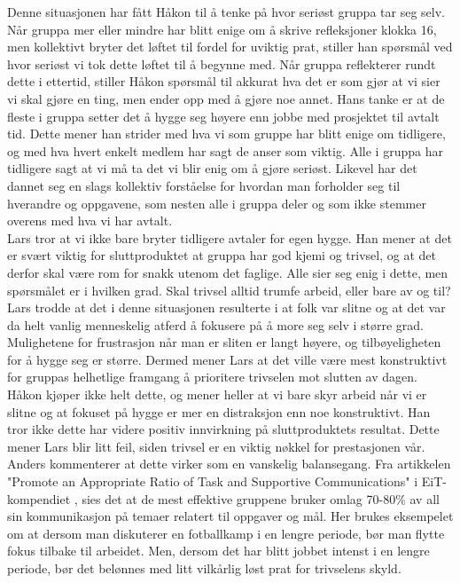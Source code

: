 Denne situasjonen har fått Håkon til å tenke på hvor seriøst gruppa tar seg selv. Når gruppa mer eller mindre har blitt enige om å skrive refleksjoner klokka 16, men kollektivt bryter det løftet til fordel for uviktig prat, stiller han spørsmål ved hvor seriøst vi tok dette løftet til å begynne med. Når gruppa reflekterer rundt dette i ettertid, stiller Håkon spørsmål til akkurat hva det er som gjør at vi sier vi skal gjøre en ting, men ender opp med å gjøre noe annet. Hans tanke er at de fleste i gruppa setter det å hygge seg høyere enn jobbe med prosjektet til avtalt tid. Dette mener han strider med hva vi som gruppe har blitt enige om tidligere, og med hva hvert enkelt medlem har sagt de anser som viktig. Alle i gruppa har tidligere sagt at vi må ta det vi blir enig om å gjøre seriøst. Likevel har det dannet seg en slags kollektiv forståelse for hvordan man forholder seg til hverandre og oppgavene, som nesten alle i gruppa deler og som ikke stemmer overens med hva vi har avtalt.\\

Lars tror at vi ikke bare bryter tidligere avtaler for egen hygge. Han mener at det er svært viktig for sluttproduktet at gruppa har god kjemi og trivsel, og at det derfor skal være rom for snakk utenom det faglige. Alle sier seg enig i dette, men spørsmålet er i hvilken grad. Skal trivsel alltid trumfe arbeid, eller bare av og til? Lars trodde at det i denne situasjonen resulterte i at folk var slitne og at det var da helt vanlig menneskelig atferd å fokusere på å more seg selv i større grad. Mulighetene for frustrasjon når man er sliten er langt høyere, og tilbøyeligheten for å hygge seg er større. Dermed mener Lars at det ville være mest konstruktivt for gruppas helhetlige framgang å prioritere trivselen mot slutten av dagen. \\

Håkon kjøper ikke helt dette, og mener heller at vi bare skyr arbeid når vi er slitne og at fokuset på hygge er mer en distraksjon enn noe konstruktivt. Han tror ikke dette har videre positiv innvirkning på sluttproduktets resultat. Dette mener Lars blir litt feil, siden trivsel er en viktig nøkkel for prestasjonen vår. Anders kommenterer at dette virker som en vanskelig balansegang. Fra artikkelen "Promote an Appropriate Ratio of Task and Supportive Communications" i EiT-kompendiet \cite{groupEfficiencyModel}, sies det at de mest effektive gruppene bruker omlag 70-80\% av all sin kommunikasjon på temaer relatert til oppgaver og mål. Her brukes eksempelet om at dersom man diskuterer en fotballkamp i en lengre periode, bør man flytte fokus tilbake til arbeidet. Men, dersom det har blitt jobbet intenst i en lengre periode, bør det belønnes med litt vilkårlig løst prat for trivselens skyld. \\

